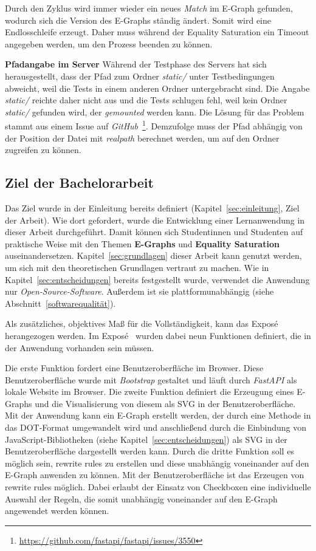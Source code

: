 Durch den Zyklus wird immer wieder ein neues \textit{Match} im E-Graph gefunden, wodurch sich die Version des E-Graphs ständig ändert. Somit wird eine Endlosschleife erzeugt.
Daher muss während der Equality Saturation ein Timeout angegeben werden, um den Prozess beenden zu können. 

\noindent\textbf{Pfadangabe im Server} Während der Testphase des Servers hat sich herausgestellt, dass der Pfad zum Ordner \textit{static/} unter Testbedingungen abweicht, weil
die Tests in einem anderen Ordner untergebracht sind. Die Angabe \textit{static/} reichte daher nicht aus und die Tests schlugen fehl, weil kein Ordner \textit{static/} gefunden wird, der \textit{gemounted} werden kann. Die Lösung für das Problem stammt aus einem Issue auf 
\textit{GitHub}~\footnote{\hspace{1.5mm}\url{https://github.com/fastapi/fastapi/issues/3550}}. Demzufolge muss der Pfad abhängig von der Position der Datei mit \textit{realpath} berechnet werden, um
auf den Ordner zugreifen zu können.

\subsection{Ziel der Bachelorarbeit}\label{sub:ziel}

Das Ziel wurde in der Einleitung bereits definiert (Kapitel~\ref{sec:einleitung}, Ziel der Arbeit).
Wie dort gefordert, wurde die Entwicklung einer Lernanwendung in dieser Arbeit durchgeführt. Damit können sich Studentinnen und Studenten auf praktische Weise mit den Themen 
\textbf{E-Graphs} und \textbf{Equality Saturation} auseinandersetzen. Kapitel~\ref{sec:grundlagen} dieser Arbeit kann genutzt werden, um sich mit den
theoretischen Grundlagen vertraut zu machen. 
Wie in Kapitel~\ref{sec:entscheidungen} bereits festgestellt wurde, verwendet die Anwendung nur \textit{Open-Source-Software}. Außerdem ist
sie plattformunabhängig (siehe Abschnitt~\ref{softwarequalität}).

Als zusätzliches, objektives Maß für die Vollständigkeit, kann das Exposé herangezogen werden.
Im Exposé~\cite{expose} wurden dabei neun Funktionen definiert, die in der Anwendung vorhanden sein müssen.

Die erste Funktion fordert eine Benutzeroberfläche im Browser. Diese Benutzeroberfläche wurde mit \textit{Bootstrap} gestaltet und läuft durch \textit{FastAPI} als lokale Website 
im Browser. Die zweite Funktion definiert die Erzeugung eines E-Graphs und die Visualisierung von diesem als SVG in der Benutzeroberfläche. Mit der Anwendung kann ein E-Graph erstellt
werden, der durch eine Methode in das DOT-Format umgewandelt wird und anschließend durch die Einbindung von JavaScript-Bibliotheken (siehe Kapitel~\ref{sec:entscheidungen}) als SVG in der Benutzeroberfläche dargestellt werden kann.
Durch die dritte Funktion soll es möglich sein, rewrite rules zu erstellen und diese unabhängig voneinander auf den E-Graph anwenden zu können.  
Mit der Benutzeroberfläche ist das Erzeugen von rewrite rules möglich. Dabei erlaubt der Einsatz von Checkboxen eine individuelle Auswahl der Regeln, die somit unabhängig
voneinander auf den E-Graph angewendet werden können.

